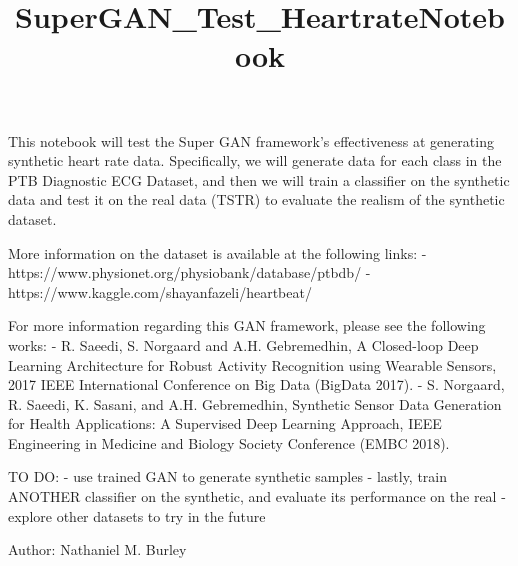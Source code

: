 \documentclass[11pt]{article}
\title{SuperGAN\_Test\_HeartrateNotebook}
\begin{document}
    
    
    \maketitle
    
    

    
    This notebook will test the Super GAN framework's effectiveness at
generating synthetic heart rate data. Specifically, we will generate
data for each class in the PTB Diagnostic ECG Dataset, and then we will
train a classifier on the synthetic data and test it on the real data
(TSTR) to evaluate the realism of the synthetic dataset.

More information on the dataset is available at the following links: -
https://www.physionet.org/physiobank/database/ptbdb/ -
https://www.kaggle.com/shayanfazeli/heartbeat/

For more information regarding this GAN framework, please see the
following works: - R. Saeedi, S. Norgaard and A.H. Gebremedhin, A
Closed-loop Deep Learning Architecture for Robust Activity Recognition
using Wearable Sensors, 2017 IEEE International Conference on Big Data
(BigData 2017). - S. Norgaard, R. Saeedi, K. Sasani, and A.H.
Gebremedhin, Synthetic Sensor Data Generation for Health Applications: A
Supervised Deep Learning Approach, IEEE Engineering in Medicine and
Biology Society Conference (EMBC 2018).

TO DO: - use trained GAN to generate synthetic samples - lastly, train
ANOTHER classifier on the synthetic, and evaluate its performance on the
real - explore other datasets to try in the future

Author: Nathaniel M. Burley
\end{document}
